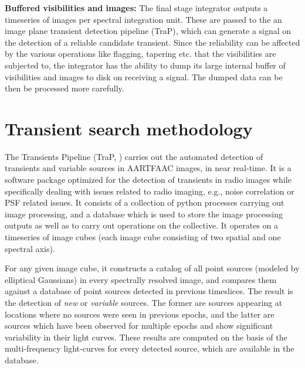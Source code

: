 \documentclass{ws-jai}
\begin{document}
\noindent \textbf {Buffered visibilities and images:} The final stage integrator
outputs a timeseries  of images per spectral integration unit.  These are passed
to the an image plane transient  detection pipeline (TraP), which can generate a
signal on the detection of a reliable candidate transient. Since the reliability
can be affected by the various operations like flagging, tapering etc.  that the
visibilities are subjected to, the integrator  has the ability to dump its large
internal buffer  of visibilities and images  to disk on receiving  a signal. The
dumped data can be then be processed more carefully.\\


\section {\label{sec:trap} Transient search methodology}
The  Transients  Pipeline  (TraP,  \citep{swinbank2015lofar})  carries  out  the
automated detection  of transients and  variable sources in AARTFAAC  images, in
near  real-time.  It  is  a  software package  optimized  for  the detection  of
transients in  radio images  while specifically dealing  with issues  related to
radio imaging, e.g., noise correlation or  PSF related issues.  It consists of a
collection of  python processes  carrying out image  processing, and  a database
which is  used to store  the image  processing outputs as  well as to  carry out
operations on the collective.  It operates  on a timeseries of image cubes (each
image cube consisting of two spatial and one spectral axis).

For any given image cube, it constructs  a catalog of all point sources (modeled
by elliptical Gaussians)  in every spectrally resolved image,  and compares them
against a database of point sources detected in previous timeslices.  The result
is the detection  of \textit{new} or \textit{variable} sources.   The former are
sources appearing  at locations where no  sources were seen in  previous epochs,
and the latter are sources which have been observed for multiple epochs and show
significant variability in their light curves. These results are computed on the
basis of the  multi-frequency light-curves for every detected  source, which are
available in the database.
\end{document}

